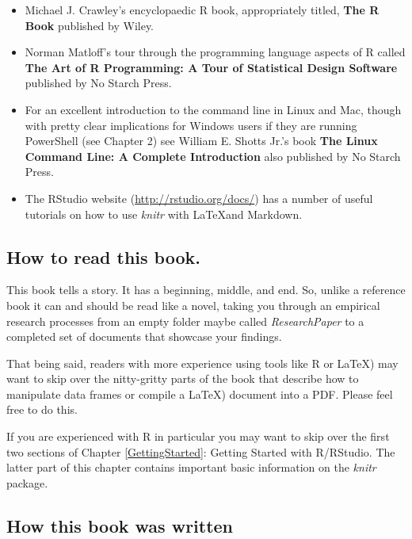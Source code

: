 \documentclass[ChapterTOCs,krantz1]{krantz}\usepackage{graphicx, color}
\begin{document}
\begin{itemize}
    \item Michael J. Crawley's encyclopaedic R book, appropriately   titled, \textbf{The R Book} published by Wiley.
    
    \item Norman Matloff's tour through the programming language aspects of  R called \textbf{The Art of R Programming: A Tour of Statistical Design Software} published by No Starch Press.
    
    \item For an excellent introduction to the command line in Linux and Mac, though with pretty clear implications for Windows users if they are running PowerShell (see Chapter 2) see William E. Shotts Jr.'s book \textbf{The Linux Command Line: A Complete Introduction} also published by No Starch Press.
    
    \item The RStudio website (\url{http://rstudio.org/docs/}) has a
  number of useful tutorials on how to use {\emph{knitr}} with \LaTeX and Markdown.
\end{itemize}

\subsection{How to read this book.}

This book tells a story. It has a beginning, middle, and end. So, unlike a reference book it can and should be read like a novel, taking you through an empirical research processes from an empty folder maybe called {\emph{ResearchPaper}} to a completed set of documents that showcase your findings.

That being said, readers with more experience using tools like R or \LaTeX) may want to skip over the nitty-gritty parts of the book that describe how to manipulate data frames or compile a \LaTeX) document into a PDF. Please feel free to do this.

If you are experienced with R in particular you may want to skip over the first two sections of Chapter \ref{GettingStarted}: Getting Started with R/RStudio. The latter part of this chapter contains important basic information on the {\emph{knitr}} package. 

\subsection{How this book was written}
\end{document}
